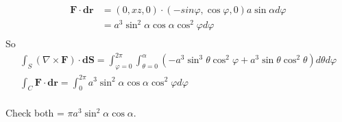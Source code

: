 \documentclass[a4paper]{article}
\begin{document}
\begin{eg}
\begin{equation*}
\begin{aligned}
\end{aligned}
\end{equation*}
\begin{equation*}
\begin{aligned}
\mathbf{F}\cdot\mathbf{dr}&=\left(0,xz,0\right)\cdot\left(-sin\varphi,\cos\varphi,0\right)a\sin\alpha d\varphi\\
&=a^3 \sin^2 \alpha\cos\alpha\cos^2 \varphi d\varphi\\
\end{aligned}
\end{equation*}
So
\begin{equation*}
\begin{aligned}
\int_{S} \left(\nabla\times\mathbf{F}\right)\cdot\mathbf{dS}=\int_{\varphi=0}^{2\pi} \int_{\theta=0}^\alpha \left(-a^3 \sin^3 \theta\cos^2 \varphi + a^3 \sin\theta\cos^2 \theta\right) d\theta d\varphi\\
\int_{C} \mathbf{F}\cdot\mathbf{dr}=\int_{0}^{2\pi} a^3 \sin^2 \alpha\cos\alpha\cos^2 \varphi d\varphi\\
\end{aligned}
\end{equation*}

Check both = $\pi a^3 \sin^2 \alpha\cos\alpha$.
\end{eg}
\end{document}

